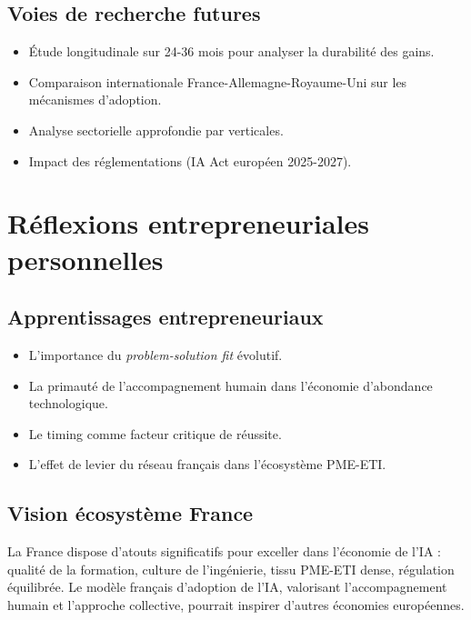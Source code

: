 \subsection{Voies de recherche futures}
\begin{itemize}
    \item Étude longitudinale sur 24-36 mois pour analyser la durabilité des gains.
    \item Comparaison internationale France-Allemagne-Royaume-Uni sur les mécanismes d’adoption.
    \item Analyse sectorielle approfondie par verticales.
    \item Impact des réglementations (IA Act européen 2025-2027).
\end{itemize}

\section{Réflexions entrepreneuriales personnelles}

\subsection{Apprentissages entrepreneuriaux}
\begin{itemize}
    \item L’importance du \textit{problem-solution fit} évolutif.
    \item La primauté de l’accompagnement humain dans l’économie d’abondance technologique.
    \item Le timing comme facteur critique de réussite.
    \item L’effet de levier du réseau français dans l’écosystème PME-ETI.
\end{itemize}

\subsection{Vision écosystème France}
La France dispose d’atouts significatifs pour exceller dans l’économie de l’IA : qualité de la formation, culture de l’ingénierie, tissu PME-ETI dense, régulation équilibrée. Le modèle français d’adoption de l’IA, valorisant l’accompagnement humain et l’approche collective, pourrait inspirer d’autres économies européennes.


